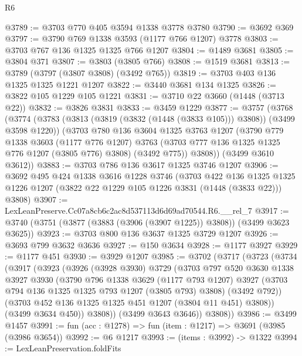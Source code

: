 \begin{lexlean}{R6}
\begin{coremodule}
@3789 := @3703 @770 @405 @3594 @1338 @3778 @3780
@3790 := @3692 @369
@3797 := @3790 @769 @1338 @3593 (@1177 @766 @1207) @3778
@3803 := @3703 @767 @136 @1325 @1325 @766 @1207
@3804 := @1489 @3681
@3805 := @3804 @371
@3807 := @3803 (@3805 @766)
@3808 := @1519 @3681
@3813 := @3789 (@3797 (@3807 @3808) (@3492 @765))
@3819 := @3703 @403 @136 @1325 @1325 @1221 @1207
@3822 := @3440 @3681 @134 @1325
@3826 := @3822 @105 @1229 @105 @1221
@3831 := @3710 @22 @3660 (@1448 (@3713 @22))
@3832 := @3826 @3831
@3833 := @3459 @1229
@3877 := @3757
    (@3768
      (@3774
        (@3783 (@3813 (@3819 (@3832 (@1448 (@3833 @105))) @3808)) (@3499 @3598 @1220))
        (@3703
          @780
          @136
          @3604
          @1325
          @3763
          @1207
          (@3790
            @779
            @1338
            @3603
            (@1177 @776 @1207)
            @3763
            (@3703 @777 @136 @1325 @1325 @776 @1207 (@3805 @776) @3808)
            (@3492 @775))
          @3808))
      (@3499 @3610 @3612))
@3883 := @3703 @786 @136 @3617 @1325 @3746 @1207
@3906 := @3692
    @495
    @424
    @1338
    @3616
    @1228
    @3746
    (@3703
      @422
      @136
      @1325
      @1325
      @1226
      @1207
      (@3822 @22 @1229 @105 @1226 @3831 (@1448 (@3833 @22)))
      @3808)
@3907 := LexLeanPreserve.Cc07a8cb6c2ac8d537113d6d69ad70544.R6.__rel_7
@3917 := @3740 (@3751 (@3877 (@3883 (@3906 (@3907 @1225)) @3808)) (@3499 @3623 @3625))
@3923 := @3703 @800 @136 @3637 @1325 @3729 @1207
@3926 := @3693 @799 @3632 @3636
@3927 := @150 @3634
@3928 := @1177 @3927
@3929 := @1177 @451
@3930 := @3929 @1207
@3985 := @3702
    (@3717
      (@3723
        (@3734
          (@3917
            (@3923
              (@3926
                (@3928 @3930)
                @3729
                (@3703
                  @797
                  @520
                  @3630
                  @1338
                  @3927
                  @3930
                  (@3790
                    @796
                    @1338
                    @3629
                    (@1177 @793 @1207)
                    @3927
                    (@3703 @794 @136 @1325 @1325 @793 @1207 (@3805 @793) @3808)
                    (@3492 @792))
                  (@3703 @452 @136 @1325 @1325 @451 @1207 (@3804 @11 @451) @3808))
                (@3499 @3634 @450))
              @3808))
          (@3499 @3643 @3646))
        @3808))
@3986 := @3499 @1457
@3991 := fun (acc : @1278) => fun (item : @1217) => @3691 (@3985 (@3986 @3654))
@3992 := @6 @1217
@3993 := (items : @3992) -> @1322
@3994 := LexLeanPreservation.foldFits

\end{coremodule}
\end{lexlean}
